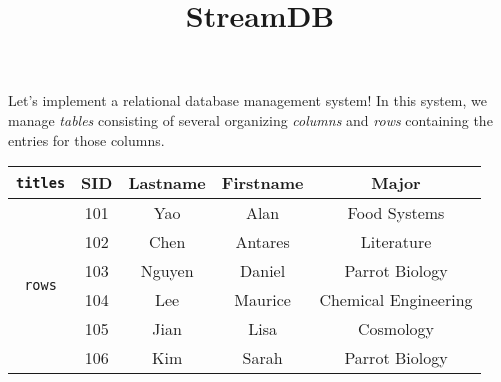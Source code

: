 \documentclass[11pt]{article}
\title{\vspace{-2pc}StreamDB\vspace{-2pc}}
\author{}
\date{}
\begin{document}
\maketitle

Let's implement a relational database management system! In this system, we manage \textit{tables} consisting of several organizing \textit{columns} and \textit{rows} containing the entries for those columns.

\vspace{1pc}

\setlength{\tabcolsep}{1em}
\begin{center}
\begin{tabular}{c | c c c c}
    \texttt{titles} & SID & Lastname & Firstname & Major \\
    \hline
    \multirow{6}{3em}{\texttt{rows}}
    & 101 & Yao & Alan & Food Systems \\
    & 102 & Chen & Antares & Literature \\
    & 103 & Nguyen & Daniel & Parrot Biology \\
    & 104 & Lee & Maurice & Chemical Engineering \\
    & 105 & Jian & Lisa & Cosmology \\
    & 106 & Kim & Sarah & Parrot Biology \\
\end{tabular}
\end{center}
\end{document}

